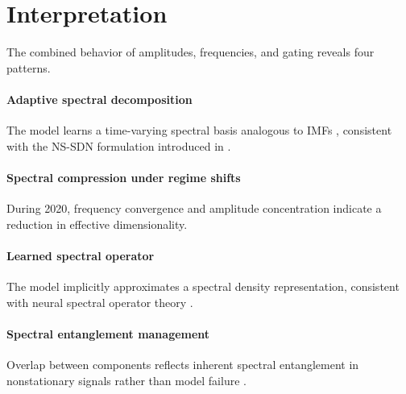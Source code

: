 \section{Interpretation}
The combined behavior of amplitudes, frequencies, and gating reveals four patterns.
\paragraph{Adaptive spectral decomposition} The model learns a time-varying spectral basis analogous to IMFs \cite{huang1998empirical}, consistent with the NS-SDN formulation introduced in \cite{sunder2026nssdn}.
\paragraph{Spectral compression under regime shifts} During 2020, frequency convergence and amplitude concentration indicate a reduction in effective dimensionality.
\paragraph{Learned spectral operator} The model implicitly approximates a spectral density representation, consistent with neural spectral operator theory \cite{mohammadi2026spectral}.
\paragraph{Spectral entanglement management} Overlap between components reflects inherent spectral entanglement in nonstationary signals rather than model failure \cite{an2026fredn}.
